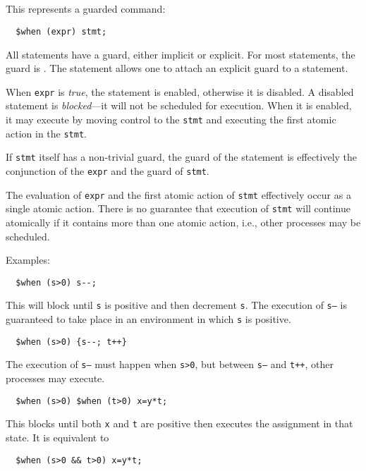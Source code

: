 \documentclass[11pt, oneside, letterpaper]{book}
\begin{document}
\subsection{\cwhen} This represents a guarded command:
\begin{verbatim}
  $when (expr) stmt;
\end{verbatim}
All statements have a guard, either implicit or explicit.  For most
statements, the guard is \ctrue.  The \cwhen{} statement allows one to
attach an explicit guard to a statement.

When \texttt{expr} is \emph{true}, the statement is enabled, otherwise
it is disabled.  A disabled statement is \emph{blocked}---it will not
be scheduled for execution.  When it is enabled, it may execute by
moving control to the \texttt{stmt} and executing the first atomic
action in the \texttt{stmt}.

If \texttt{stmt} itself has a non-trivial guard, the guard of the
\cwhen{} statement is effectively the conjunction of the \texttt{expr}
and the guard of \texttt{stmt}.

The evaluation of \texttt{expr} and the first atomic action of
\texttt{stmt} effectively occur as a single atomic action.  There is
no guarantee that execution of \texttt{stmt} will continue atomically
if it contains more than one atomic action, i.e., other processes may
be scheduled.

Examples:
\begin{verbatim}
  $when (s>0) s--;
\end{verbatim}
This will block until \texttt{s} is positive and then decrement
\texttt{s}.  The execution of \texttt{s--} is guaranteed to take place
in an environment in which \texttt{s} is positive.

\begin{verbatim}
  $when (s>0) {s--; t++}
\end{verbatim}
The execution of \texttt{s--} must happen when \texttt{s>0}, but
between \texttt{s--} and \texttt{t++}, other processes may execute.

\begin{verbatim}
  $when (s>0) $when (t>0) x=y*t;
\end{verbatim}
This blocks until both \texttt{x} and \texttt{t} are positive then
executes the assignment in that state.  It is equivalent to
\begin{verbatim}
  $when (s>0 && t>0) x=y*t;
\end{verbatim}
\end{document}
